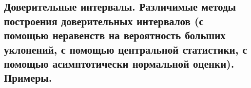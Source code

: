 \subsection{Доверительные интервалы. Различимые методы построения доверительных интервалов (с помощью неравенств на вероятность больших уклонений, с помощью центральной статистики, с помощью асимптотически нормальной оценки). Примеры.}